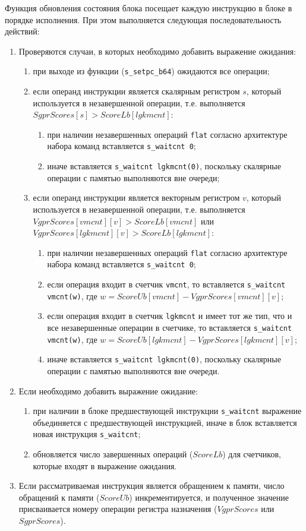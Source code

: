 \documentclass[a4paper,14pt]{extarticle}
\newenvironment{ol}{\begin{enumerate}[noitemsep,topsep=0em]}{\end{enumerate}\vspace{4mm}}
\newenvironment{inlineol}{\begin{enumerate}[noitemsep,topsep=0em]}{\end{enumerate}}
\begin{document}
Функция обновления состояния блока посещает каждую инструкцию в блоке в порядке
исполнения. При этом выполняется следующая последовательность действий:
\begin{ol}
\item Проверяются случаи, в которых необходимо добавить выражение ожидания:
  \begin{ol}
  \item при выходе из функции (\texttt{s\_setpc\_b64}) ожидаются все операции;
  \item если операнд инструкции является скалярным регистром $s$, который используется в
    незавершенной операции, т.е. выполняется $SgprScores[s] > ScoreLb[lgkmcnt]$:
    \begin{inlineol}
    \item при наличии незавершенных операций \texttt{flat} согласно архитектуре набора
      команд\cite[Глава~9.2.2]{vega-isa} вставляется \texttt{s\_waitcnt 0};
    \item иначе вставляется \texttt{s\_waitcnt lgkmcnt(0)}, поскольку скалярные операции с памятью
      выполняются вне очереди;
    \end{inlineol}
  \item если операнд инструкции является векторным регистром $v$, который используется в
    незавершенной операции, т.е. выполняется $VgprScores[vmcnt][v] > ScoreLb[vmcnt]$ или
    $VgprScores[lgkmcnt][v] > ScoreLb[lgkmcnt]$:
    \begin{inlineol}
    \item при наличии незавершенных операций \texttt{flat} согласно архитектуре набора
      команд вставляется \texttt{s\_waitcnt 0};
    \item если операция входит в счетчик \texttt{vmcnt}, то вставляется \texttt{s\_waitcnt vmcnt(w)},
      где $w = ScoreUb[vmcnt] - VgprScores[vmcnt][v]$;
    \item если операция входит в счетчик \texttt{lgkmcnt} и имеет тот же тип, что и все
      незавершенные операции в счетчике, то вставляется \texttt{s\_waitcnt vmcnt(w)},
      где $w = ScoreUb[lgkmcnt] - VgprScores[lgkmcnt][v]$;
    \item иначе вставляется \texttt{s\_waitcnt lgkmcnt(0)}, поскольку скалярные операции с памятью
      выполняются вне очереди.
    \end{inlineol}
  \end{ol}
\item Если необходимо добавить выражение ожидание:
  \begin{ol}
  \item при наличии в блоке предшествующей инструкции \texttt{s\_waitcnt} выражение объединяется
    с предшествующей инструкцией, иначе в блок вставляется новая инструкция \texttt{s\_waitcnt};
  \item обновляется число завершенных операций ($ScoreLb$) для счетчиков,
    которые входят в выражение ожидания.
  \end{ol}
\item Если рассматриваемая инструкция является обращением к памяти,
  число обращений к памяти ($ScoreUb$) инкрементируется, и полученное значение
  присваивается номеру операции регистра назначения ($VgprScores$ или $SgprScores$).
\end{ol}
\end{document}
